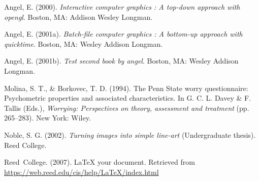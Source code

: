 \documentclass[12pt,twoside]{reedthesis}
\begin{document}
\setlength{\parindent}{-0.20in}
\setlength{\leftskip}{0.20in}
\setlength{\parskip}{8pt}

\hypertarget{refs}{}
\leavevmode\hypertarget{ref-angel2000}{}%
Angel, E. (2000). \emph{Interactive computer graphics : A top-down approach with opengl}. Boston, MA: Addison Wesley Longman.

\leavevmode\hypertarget{ref-angel2001}{}%
Angel, E. (2001a). \emph{Batch-file computer graphics : A bottom-up approach with quicktime}. Boston, MA: Wesley Addison Longman.

\leavevmode\hypertarget{ref-angel2002a}{}%
Angel, E. (2001b). \emph{Test second book by angel}. Boston, MA: Wesley Addison Longman.

\leavevmode\hypertarget{ref-Molina1994}{}%
Molina, S. T., \& Borkovec, T. D. (1994). The Penn State worry questionnaire: Psychometric properties and associated characteristics. In G. C. L. Davey \& F. Tallis (Eds.), \emph{Worrying: Perspectives on theory, assessment and treatment} (pp. 265--283). New York: Wiley.

\leavevmode\hypertarget{ref-noble2002}{}%
Noble, S. G. (2002). \emph{Turning images into simple line-art} (Undergraduate thesis). Reed College.

\leavevmode\hypertarget{ref-reedweb2007}{}%
Reed~College. (2007). LaTeX your document. Retrieved from \url{https://web.reed.edu/cis/help/LaTeX/index.html}


\end{document}
